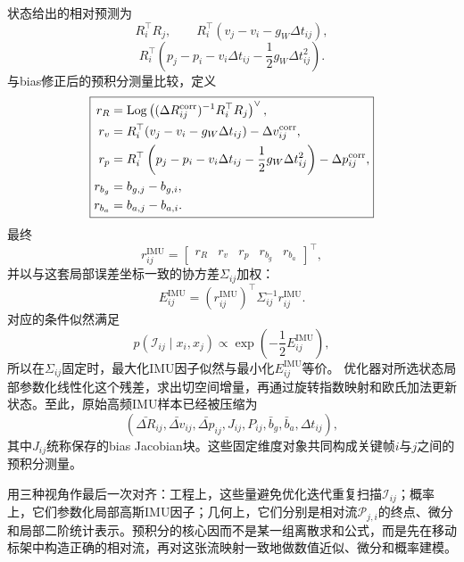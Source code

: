 状态给出的相对预测为
\[
    R_i^\top R_j,
    \qquad
    R_i^\top(v_j-v_i-g_W\Delta t_{ij}),
\]
\[
    R_i^\top
    \left(
      p_j-p_i-v_i\Delta t_{ij}
      -\frac12g_W\Delta t_{ij}^2
    \right).
\]
与bias修正后的预积分测量比较，定义
\[
\boxed{
\begin{aligned}
    r_R
    &=\operatorname{Log}\left(
      (\Delta R_{ij}^{\mathrm{corr}})^{-1}R_i^\top R_j
      \right)^\vee,\\
    r_v
    &=R_i^\top(v_j-v_i-g_W\Delta t_{ij})
      -\Delta v_{ij}^{\mathrm{corr}},\\
    r_p
    &=R_i^\top
      \left(
        p_j-p_i-v_i\Delta t_{ij}
        -\frac12g_W\Delta t_{ij}^2
      \right)
      -\Delta p_{ij}^{\mathrm{corr}},\\
    r_{b_g}
    &=b_{g,j}-b_{g,i},\\
    r_{b_a}
    &=b_{a,j}-b_{a,i}.
\end{aligned}
}
\]
最终
\[
\boxed{
    r_{ij}^{\mathrm{IMU}}
    =\begin{bmatrix}
      r_R&r_v&r_p&r_{b_g}&r_{b_a}
     \end{bmatrix}^\top,
}
\]
并以与这套局部误差坐标一致的协方差$\Sigma_{ij}$加权：
\[
\boxed{
    E_{ij}^{\mathrm{IMU}}
    =(r_{ij}^{\mathrm{IMU}})^\top
      \Sigma_{ij}^{-1}r_{ij}^{\mathrm{IMU}}.
}
\]
对应的条件似然满足
\[
    p(\mathcal I_{ij}\mid x_i,x_j)
    \propto
    \exp\left(-\frac12E_{ij}^{\mathrm{IMU}}\right),
\]
所以在$\Sigma_{ij}$固定时，最大化IMU因子似然与最小化$E_{ij}^{\mathrm{IMU}}$等价。
优化器对所选状态局部参数化线性化这个残差，求出切空间增量，再通过旋转指数映射和欧氏加法更新状态。至此，原始高频IMU样本已经被压缩为
\[
\boxed{
\left(
\bar{\Delta R}_{ij},
\bar{\Delta v}_{ij},
\bar{\Delta p}_{ij},
J_{ij},
P_{ij},
\bar b_g,
\bar b_a,
\Delta t_{ij}
\right),
}
\]
其中$J_{ij}$统称保存的bias Jacobian块。这些固定维度对象共同构成关键帧$i$与$j$之间的预积分测量。

用三种视角作最后一次对齐：工程上，这些量避免优化迭代重复扫描$\mathcal I_{ij}$；概率上，它们参数化局部高斯IMU因子；几何上，它们分别是相对流$\mathcal P_{j,i}$的终点、微分和局部二阶统计表示。预积分的核心因而不是某一组离散求和公式，而是先在移动标架中构造正确的相对流，再对这张流映射一致地做数值近似、微分和概率建模。

